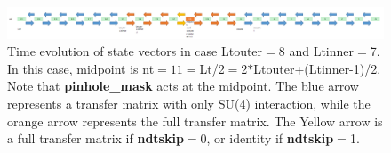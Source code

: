 \documentclass[10pt]{book}
\begin{document}
\begin{figure}[h]
	\centering
	\includegraphics[width=1.0\linewidth]{fig_transfer_matrix}
	\caption{Time evolution of state vectors in case Ltouter$=$8 and Ltinner$=$7.
		In this case, midpoint is nt$=11=$Lt/2$=$2$*$Ltouter+(Ltinner-1)/2.
		Note that {\bf pinhole\_mask} acts at the midpoint. 
		The blue arrow represents a transfer matrix with only SU(4) interaction,
		while the orange arrow represents the full transfer matrix. 
		The Yellow arrow is a full transfer matrix if {\bf ndtskip}$=$0,
		or identity if {\bf ndtskip}$=$1. 	
	}
	\label{fig:figtransfermatrix}
\end{figure}
\end{document}
